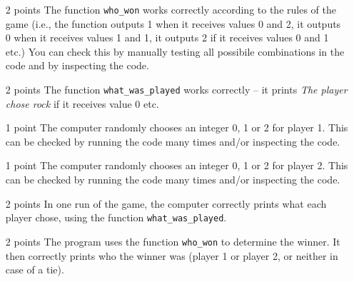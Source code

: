 \documentclass[11pt, a4paper]{article}
\begin{document}
\begin{itemize}
    \item[2 points]	The function \texttt{who\_won} works correctly according to the rules of the game (i.e., the function outputs 1 when it receives values 0 and 2, it outputs 0 when it receives values 1 and 1, it outputs 2 if it receives values 0 and 1 etc.) You can check this by manually testing all possibile combinations in the code and by inspecting the code.
    \item[2 points] The function \texttt{what\_was\_played} works correctly -- it prints \textit{The player chose rock} if it receives value 0 etc.
\item[1 point] The computer randomly chooses an integer 0, 1 or 2 for player 1. This can be checked by running the code many times and/or inspecting the code.
\item[1 point] The computer randomly chooses an integer 0, 1 or 2 for player 2. This can be checked by running the code many times and/or inspecting the code.
\item[2 points] In one run of the game, the computer correctly prints what each player chose, using the function \texttt{what\_was\_played}.
\item[2 points] The program uses the function \texttt{who\_won} to determine the winner. It then correctly prints who the winner was (player 1 or player 2, or neither in case of a tie).
\end{itemize}
\end{document}

